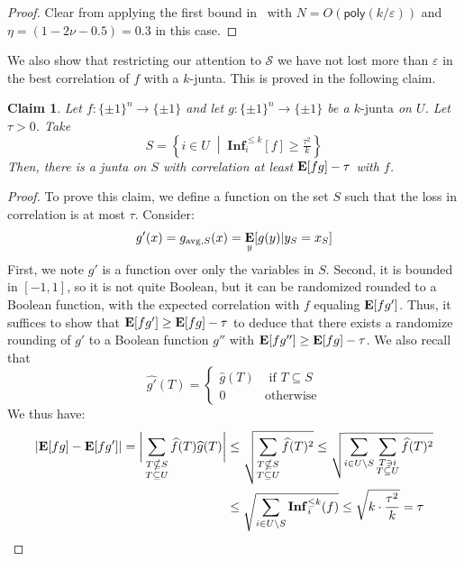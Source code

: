\documentclass[10pt,a4paper]{article}
\providecommand{\poly}{\mathsf{poly}}
\theoremstyle{plain}
\newtheorem{claim}[theorem]{Claim}
\theoremstyle{remark}
\theoremstyle{plain}
\providecommand{\E}{}
\renewcommand{\E}{\mathop{\bf E\/}}
\newcommand\Inf{{\mathbf{Inf}}}
\newcommand{\eps}{\varepsilon}
\renewcommand{\hat}{\widehat}
\newcommand{\calS}{\mathcal{S}}
\newcommand{\avg}{\operatorname{avg}}
\newcommand{\InfluentialCoords}{\calS}
\begin{document}
\begin{proof}
Clear from applying the first bound in~ with $N = O(\poly(k/\eps))$ and  $\eta =(1-2\nu-0.5) = 0.3$ in this case.
\end{proof}


We also show that restricting our attention to $\InfluentialCoords$ we have not lost more than $\eps$ in the best correlation of $f$ with a $k$-junta. This is proved in the following claim.
\begin{claim}
\label{claim:improved-junta-corr}
    Let $f: \{\pm 1 \}^n \to \{\pm 1\}$ and let $g: \{\pm 1\}^n \to \{\pm 1\}$ be a $k\text{-junta}$ on $U$.
    Let $\tau >0$. Take $$S= \left\{i \in U\; \middle\vert\; \Inf_i^{\leq k}[f] \geq \tfrac{\tau^2}{k}\right\}$$
    Then, there is a junta on $S$ with correlation at least $\E[fg] - \tau$ with $f$.
\end{claim}


\begin{proof}
To prove this claim, we define a function on the set $S$ such that the loss in correlation is at most $\tau$. Consider:
$$g'(x) = g_{\avg,S}(x) =  \E_y[g(y)|y_S = x_S]$$
First, we note $g'$ is a function over only the variables in $S$. Second, it is bounded in $[-1,1]$, so it is not quite Boolean, but it can be randomized rounded to a Boolean function, with the expected correlation with $f$ equaling $\E[fg']$. Thus, it suffices to show that $\E[fg'] \ge \E[fg]-\tau$ to deduce that there exists a randomize rounding of $g'$ to a Boolean function $g''$ with $\E[f g''] \ge \E[fg]-\tau$. We also recall that 
\[
\hat{g'}(T) = \begin{cases}
\hat{g}(T) & \text{ if } T \subseteq S \\
0 & \text{otherwise}
\end{cases}
\]
We thus have:
\begin{align*}
    \left| \E[fg] - \E[fg']\right| = \bigg|  \sum_{\substack{T\nsubseteq S \\ T \subseteq U}} \hat{f}(T)\hat{g}(T)\bigg|
    &\leq \sqrt{\sum_{\substack{T\nsubseteq S \\ T \subseteq U}} \hat{f}(T)^2} 
    \leq \sqrt{\sum_{i\in U\setminus S} \sum_{\substack{T \ni i \\ T \subseteq U}} \hat{f}(T)^2} \\
    &\leq \sqrt{\sum_{i\in U\setminus S}\Inf_i^{\leq k}(f)}
    \leq \sqrt{k \cdot \frac{\tau^2}{k}} = \tau \qedhere
\end{align*}
\end{proof}
\end{document}
